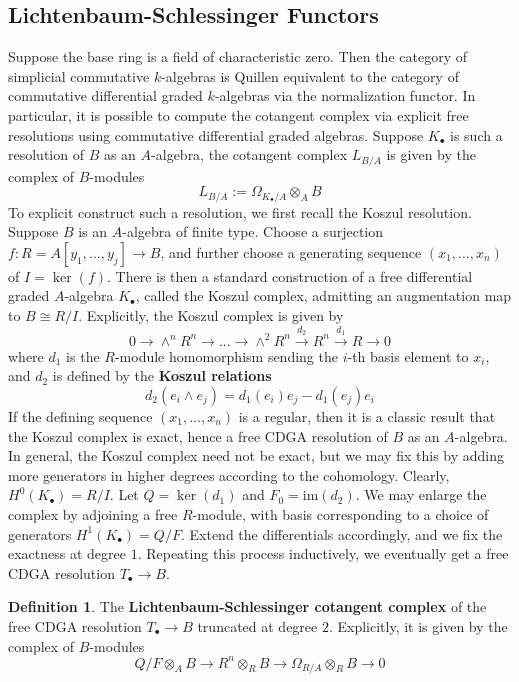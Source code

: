 \documentclass{article}
\theoremstyle{definition}
\theoremstyle{definition}
\newtheorem{definition}{Definition}[theorem]
\theoremstyle{definition}
\theoremstyle{definition}
\theoremstyle{definition}
\theoremstyle{definition}
\theoremstyle{definition}
\begin{document}
\subsection{Lichtenbaum-Schlessinger Functors} 
Suppose the base ring is a field of characteristic zero. Then the category of simplicial commutative $k$-algebras is Quillen equivalent to the category of commutative differential graded $k$-algebras via the normalization functor. In particular, it is possible to compute the cotangent complex via explicit free resolutions using commutative differential graded algebras. Suppose $K_{\bullet}$ is such a resolution of $B$ as an $A$-algebra, the cotangent complex $L_{B/A}$ is given by the complex of $B$-modules 
\[L_{B/A}:= \Omega_{K_{\bullet}/A}\otimes_A B\]
To explicit construct such a resolution, we first recall the Koszul resolution. Suppose $B$ is an $A$-algebra of finite type. Choose a surjection $f:R=A[y_1,...,y_j]\to B$, and further choose a generating sequence $(x_1,...,x_n)$ of $I= \ker(f)$. There is then a standard construction of a free differential graded $A$-algebra $K_{\bullet}$, called the Koszul complex, admitting an augmentation map to $B\cong R/I$.  Explicitly, the Koszul complex is given by
\[ 0\to \wedge^n R^n\to ...\to \wedge^2 R^n \xrightarrow{d_2} R^n\xrightarrow{d_1} R\to 0\]
where $d_1$ is the $R$-module homomorphism sending the $i$-th basis element to $x_i$, and $d_2$ is defined by the \textbf{Koszul relations}
\[d_2(e_i\wedge e_j)= d_1(e_i) e_j - d_1(e_j) e_i\]
If the defining sequence $(x_1,...,x_n)$ is a regular, then it is a classic result that the Koszul complex is exact, hence a free CDGA resolution of $B$ as an $A$-algebra. In general, the Koszul complex need not be exact, but we may fix this by adding more generators in higher degrees according to the cohomology. Clearly, $H^0(K_{\bullet})=R/I$. Let $Q=\ker(d_1)$ and $F_0= \textrm{im}(d_2)$. We may enlarge the complex by adjoining a free $R$-module, with basis corresponding to a choice of generators $H^1(K_{\bullet})=Q/F$. Extend the differentials accordingly, and we fix the exactness at degree $1$. Repeating this process inductively, we eventually get a free CDGA resolution $T_{\bullet}\to B$. 

\begin{definition}
	The \textbf{Lichtenbaum-Schlessinger cotangent complex} of the free CDGA resolution $T_{\bullet}\to B$ truncated at degree $2$. Explicitly, it is given by the complex of $B$-modules
	\[Q/F\otimes_A B\to R^n\otimes_R B\to \Omega_{R/A}\otimes_R B\to 0\]
\end{definition}
\end{document}
